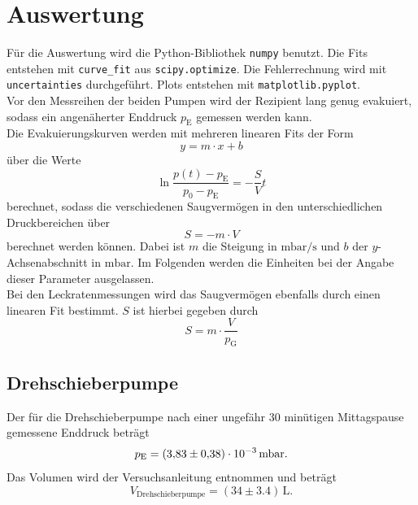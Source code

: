 \section{Auswertung}
\label{sec:Auswertung}

Für die Auswertung wird die Python-Bibliothek \texttt{numpy} benutzt. Die Fits entstehen mit \texttt{curve\_fit} aus \texttt{scipy.optimize}.
Die Fehlerrechnung wird mit \texttt{uncertainties} durchgeführt. Plots entstehen mit \texttt{matplotlib.pyplot}. \\
Vor den Messreihen der beiden Pumpen wird der Rezipient lang genug evakuiert, sodass ein angenäherter Enddruck $p_\text{E}$ gemessen werden kann. \\
Die Evakuierungskurven werden mit mehreren linearen Fits der Form
\begin{equation}
    y = m \cdot x + b
\end{equation}
über die Werte
\begin{equation}
    \ln{\frac{p(t) - p_\text{E}}{p_0 - p_\text{E}}} = -\frac{S}{V}t
    \label{eq:linfit}
\end{equation}
berechnet, sodass die verschiedenen Saugvermögen in den unterschiedlichen Druckbereichen über
\begin{equation}
    S = -m \cdot V
    \label{eq:S_evak}
\end{equation}
berechnet werden können. Dabei ist $m$ die Steigung in $\si{\milli\bar\per\second}$ und $b$ der $y$-Achsenabschnitt in $\si{\milli\bar}$. Im Folgenden werden die Einheiten bei der Angabe dieser Parameter ausgelassen.\\
Bei den Leckratenmessungen wird das Saugvermögen ebenfalls durch einen linearen Fit bestimmt.
$S$ ist hierbei gegeben durch
\begin{equation}
    S = m \cdot \frac{V}{p_\text{G}}
    \label{eq:S_leck}
\end{equation}

\subsection{Drehschieberpumpe}

Der für die Drehschieberpumpe nach einer ungefähr 30 minütigen Mittagspause gemessene Enddruck beträgt
\begin{equation}
    p_\text{E} = (\num{3.83} \pm \num{0.38}) \cdot 10^{-3} \, \si{\milli\bar}.\\
\end{equation}
Das Volumen wird der Versuchsanleitung entnommen und beträgt
\begin{equation}
    V_\text{Drehschieberpumpe} = (\num{34} \pm \num{3.4}) \, \si{\liter}.
\end{equation}


